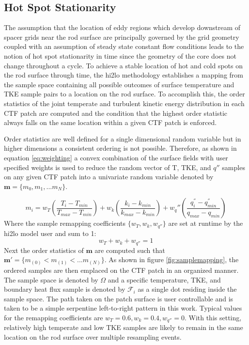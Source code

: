 \subsection{Hot Spot Stationarity}
\label{sec:hot_spot_stat}

The assumption that the location of eddy regions which develop downstream of spacer grids near the rod surface are principally governed by the grid geometry coupled with an assumption of steady state constant flow conditions leads to the notion of hot spot stationarity in time since the geometry of the core does not change throughout a cycle.  To achieve a stable location of hot and cold spots on the rod surface through time, the hi2lo methodology establishes a mapping from the sample space containing all possible outcomes of surface temperature and TKE sample pairs to a location on the rod surface.  To accomplish this, the order statistics of the joint temperate and turbulent kinetic energy distribution in each CTF patch are computed and the condition that the highest order statistic always falls on the same location within a given CTF patch is enforced.

Order statistics are well defined for a single dimensional random variable but in higher dimensions a consistent ordering is not possible.  Therefore, as shown in equation \ref{eq:weighting} a convex combination of the surface fields with user specified weights is used to reduce the random vector of T, TKE, and $q''$ samples on any given CTF patch into a univariate random variable denoted by $\mathbf{m}=\{m_0, m_1, ... m_N\}$.

\begin{equation}
    m_i = w_T \left( \frac{T_i - T_{min}}{T_{max} - T_{min}} \right) + w_k \left( \frac{k_i - k_{min}}{k_{max} - k_{min}} \right) +  w_q'' \left( \frac{q^{''}_i - q^{''}_{min}}{q_{max} - q_{min}} \right)
\label{eq:weighting}
\end{equation}
Where the sample remapping coefficients $\{w_T, w_k, w_{q''}\}$ are set at runtime by the hi2lo model user and sum to 1:
\begin{equation}
w_T + w_k + w_{q''} = 1
\end{equation}
Next the order statistics of $\mathbf m$ are computed such that $\mathbf m' = \{ m_{(0)} < m_{(1)}< ... m_{(N)} \}$.  As shown in figure \ref{fig:samplemapping}, the ordered samples are then emplaced on the CTF patch in an organized manner.  The sample space is denoted by $\Omega$ and a specific temperature, TKE, and boundary heat flux sample is denoted by $\mathcal F_i$ as a single dot residing inside the sample space.  The path taken on the patch surface is user controllable and is taken to be a simple serpentine left-to-right pattern in this work.
Typical values for the remapping coefficients are $w_T=0.6, w_k=0.4, w_{q''}=0$.  With this setting, relatively high temperate and low TKE samples are likely to remain in the same location on the rod surface over multiple resampling events.


